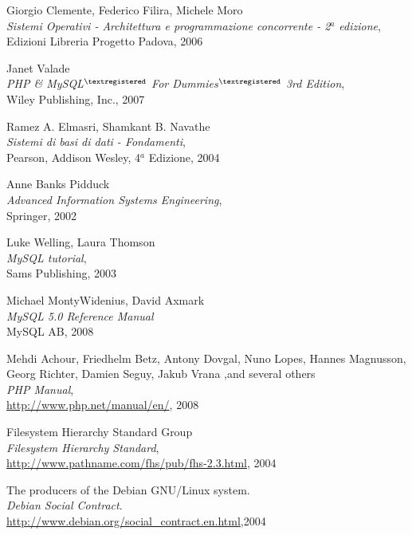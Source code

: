 \clearpage
\begin{thebibliography}{}
	
	 Giorgio Clemente, Federico Filira, Michele Moro\\
		\emph{Sistemi Operativi - Architettura e programmazione concorrente - 2$^a$ edizione},\\
		Edizioni Libreria Progetto Padova, 2006
	
	 Janet Valade\\
		\emph{PHP \& MySQL$^{\textregistered}$ For Dummies$^{\textregistered}$ 3rd Edition},\\
		Wiley Publishing, Inc., 2007
	
	 Ramez A. Elmasri, Shamkant B. Navathe\\
		\emph{Sistemi di basi di dati -  Fondamenti},\\
		Pearson, Addison Wesley, 4$^a$ Edizione, 2004
	
	 Anne Banks Pidduck\\
		\emph{Advanced Information Systems Engineering},\\
		Springer, 2002
	
	 Luke Welling, Laura Thomson\\
		\emph{MySQL tutorial},\\
		Sams Publishing, 2003
	
	Michael \qmo Monty\qmc Widenius, David Axmark\\
		\emph{MySQL 5.0 Reference Manual}\\
		MySQL AB, 2008
	
	  Mehdi Achour, Friedhelm Betz, Antony Dovgal, Nuno Lopes, Hannes Magnusson, Georg Richter, Damien Seguy, Jakub Vrana ,and several others \\
		\emph{PHP Manual},\\
		\url{http://www.php.net/manual/en/}, 2008
	
	 Filesystem Hierarchy Standard Group\\
		\emph{Filesystem Hierarchy Standard},\\
		\url{http://www.pathname.com/fhs/pub/fhs-2.3.html}, 2004
	
	 The producers of the Debian GNU/Linux system.\\
		\emph{Debian Social Contract}.\\
		\url{http://www.debian.org/social\_contract.en.html},2004
	

\end{thebibliography}
